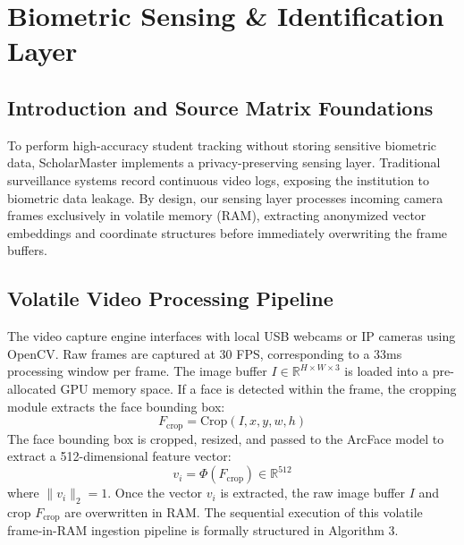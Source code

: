 \documentclass[12pt,a4paper,oneside]{report}
\begin{document}
\vfill

\chapter{Biometric Sensing \& Identification Layer}
\thispagestyle{empty}

\section{Introduction and Source Matrix Foundations}
To perform high-accuracy student tracking without storing sensitive biometric data, ScholarMaster implements a privacy-preserving sensing layer. Traditional surveillance systems record continuous video logs, exposing the institution to biometric data leakage. By design, our sensing layer processes incoming camera frames exclusively in volatile memory (RAM), extracting anonymized vector embeddings and coordinate structures before immediately overwriting the frame buffers.

\section{Volatile Video Processing Pipeline}
The video capture engine interfaces with local USB webcams or IP cameras using OpenCV. Raw frames are captured at 30 FPS, corresponding to a 33ms processing window per frame. The image buffer $I \in \mathbb{R}^{H \times W \times 3}$ is loaded into a pre-allocated GPU memory space. If a face is detected within the frame, the cropping module extracts the face bounding box:
\begin{equation}
    F_{\text{crop}} = \text{Crop}(I, x, y, w, h)
\end{equation}
The face bounding box is cropped, resized, and passed to the ArcFace model to extract a 512-dimensional feature vector:
\begin{equation}
    v_i = \Phi(F_{\text{crop}}) \in \mathbb{R}^{512}
\end{equation}
where $\|v_i\|_2 = 1$. Once the vector $v_i$ is extracted, the raw image buffer $I$ and crop $F_{\text{crop}}$ are overwritten in RAM. The sequential execution of this volatile frame-in-RAM ingestion pipeline is formally structured in Algorithm 3.
\end{document}
